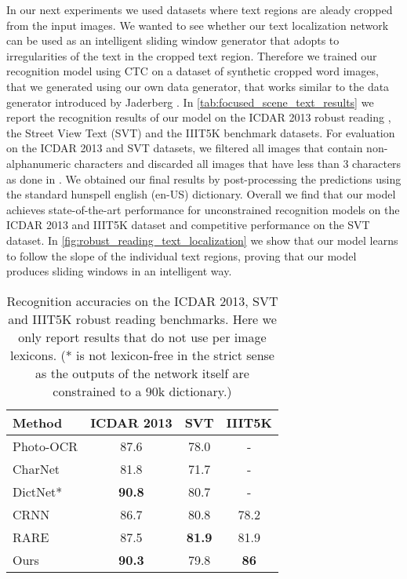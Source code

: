 \documentclass[10pt,twocolumn,letterpaper]{article}
\begin{document}
In our next experiments we used datasets where text regions are aleady cropped from the input images.
We wanted to see whether our text localization network can be used as an intelligent sliding window generator that adopts to irregularities of the text in the cropped text region.
Therefore we trained our recognition model using \ac{CTC} on a dataset of synthetic cropped word images, that we generated using our own data generator, that works similar to the data generator introduced by Jaderberg \etal \cite{Jaderberg2014Synthetic}.
In \autoref{tab:focused_scene_text_results} we report the recognition results of our model on the ICDAR 2013 robust reading \cite{Karatzas2013Icdar}, the Street View Text (SVT) \cite{Wang2011EndToEnd} and the IIIT5K \cite{Mishra2012Scene} benchmark datasets.
For evaluation on the ICDAR 2013 and SVT datasets, we filtered all images that contain non-alphanumeric characters and discarded all images that have less than 3 characters as done in \cite{Shi2016Robust,Wang2011EndToEnd}.
We obtained our final results by post-processing the predictions using the standard hunspell english (en-US) dictionary.
Overall we find that our model achieves state-of-the-art performance for unconstrained recognition models on the ICDAR 2013 and IIIT5K dataset and competitive performance on the SVT dataset.
In \autoref{fig:robust_reading_text_localization} we show that our model learns to follow the slope of the individual text regions, proving that our model produces sliding windows in an intelligent way.

\begin{table}
	\begin{center}
		\begin{tabular}{|l|c|c|c|}
			\hline
			Method & ICDAR 2013 & SVT & IIIT5K \\
			\hline
			Photo-OCR \cite{Bissacco2013Photoocr} & 87.6 & 78.0 & -\\
			CharNet \cite{Jaderberg2014Deepa} & 81.8 & 71.7 & -\\
			DictNet* \cite{Jaderberg2015Reading} & \textbf{90.8} & 80.7 & - \\
			CRNN \cite{Shi2016EndToEnd} & 86.7 & 80.8 & 78.2 \\
			RARE \cite{Shi2016Robust} & 87.5 & \textbf{81.9} & 81.9 \\
			\hline
			Ours & \textbf{90.3} & 79.8 & \textbf{86} \\
			\hline
		\end{tabular}
	\end{center}
	\caption{Recognition accuracies on the ICDAR 2013, SVT and IIIT5K robust reading benchmarks. Here we only report results that do not use per image lexicons. (*\cite{Jaderberg2015Reading} is not lexicon-free in the strict sense as the outputs of the network itself are constrained to a 90k dictionary.)}
	\label{tab:focused_scene_text_results}
\end{table}
\end{document}
